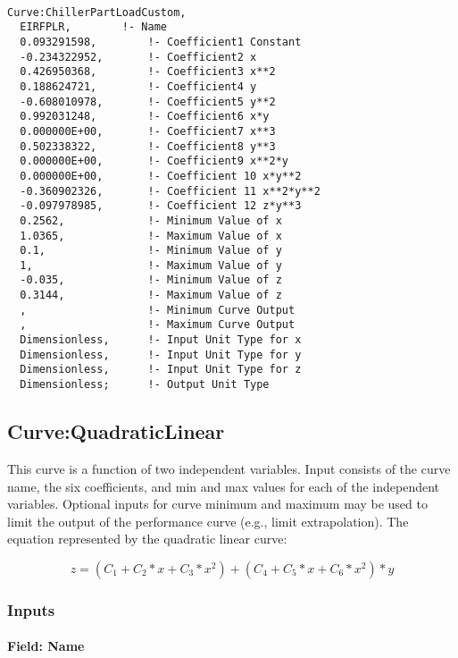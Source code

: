 \begin{lstlisting}

Curve:ChillerPartLoadCustom,
  EIRFPLR,        !- Name  
  0.093291598,        !- Coefficient1 Constant
  -0.234322952,       !- Coefficient2 x
  0.426950368,        !- Coefficient3 x**2
  0.188624721,        !- Coefficient4 y
  -0.608010978,       !- Coefficient5 y**2
  0.992031248,        !- Coefficient6 x*y
  0.000000E+00,       !- Coefficient7 x**3
  0.502338322,        !- Coefficient8 y**3
  0.000000E+00,       !- Coefficient9 x**2*y
  0.000000E+00,       !- Coefficient 10 x*y**2
  -0.360902326,       !- Coefficient 11 x**2*y**2
  -0.097978985,       !- Coefficient 12 z*y**3 
  0.2562,             !- Minimum Value of x
  1.0365,             !- Maximum Value of x
  0.1,                !- Minimum Value of y
  1,                  !- Maximum Value of y
  -0.035,             !- Minimum Value of z
  0.3144,             !- Maximum Value of z
  ,                   !- Minimum Curve Output
  ,                   !- Maximum Curve Output
  Dimensionless,      !- Input Unit Type for x
  Dimensionless,      !- Input Unit Type for y
  Dimensionless,      !- Input Unit Type for z
  Dimensionless;      !- Output Unit Type
\end{lstlisting}

\subsection{Curve:QuadraticLinear}\label{curvequadraticlinear}

This curve is a function of two independent variables. Input consists of the curve name, the six coefficients, and min and max values for each of the independent variables. Optional inputs for curve minimum and maximum may be used to limit the output of the performance curve (e.g., limit extrapolation). The equation represented by the quadratic linear curve:

\begin{equation}
z = \left( {{C_1} + {C_2}*x + {C_3}*{x^2}} \right) + \left( {{C_4} + {C_5}*x + {C_6}*{x^2}} \right)*y
\end{equation}

\subsubsection{Inputs}\label{inputs-9-012}

\paragraph{Field: Name}\label{field-name-10-010}

